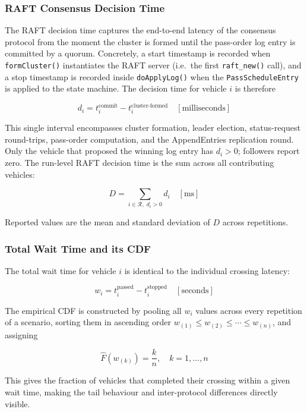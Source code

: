 \documentclass[fleqn,10pt]{olplainarticle}
\begin{document}

\subsubsection{RAFT Consensus Decision Time}

The RAFT decision time captures the end-to-end latency of the consensus protocol
from the moment the cluster is formed until the pass-order log entry is committed
by a quorum. Concretely, a start timestamp is recorded when
\texttt{formCluster()} instantiates the RAFT server (i.e.\ the first
\texttt{raft\_new()} call), and a stop timestamp is recorded inside
\texttt{doApplyLog()} when the \texttt{PassScheduleEntry} is applied to the state
machine. The decision time for vehicle $i$ is therefore

\[
  d_i = t_i^{\mathrm{commit}} - t_i^{\mathrm{cluster\text{-}formed}}
        \quad [\text{milliseconds}]
\]

This single interval encompasses cluster formation, leader election,
status-request round-trips, pass-order computation, and the AppendEntries
replication round. Only the vehicle that proposed the winning log entry has
$d_i > 0$; followers report zero. The run-level RAFT decision time is the sum
across all contributing vehicles:

\[
  D = \sum_{i \in \mathcal{R},\; d_i > 0} d_i \quad [\text{ms}]
\]

Reported values are the mean and standard deviation of $D$ across repetitions.

\subsubsection{Total Wait Time and its CDF}

The total wait time for vehicle $i$ is identical to the individual crossing
latency:

\[
  w_i = t_i^{\mathrm{passed}} - t_i^{\mathrm{stopped}} \quad [\text{seconds}]
\]

The empirical CDF is constructed by pooling all $w_i$ values across every
repetition of a scenario, sorting them in ascending order
$w_{(1)} \le w_{(2)} \le \cdots \le w_{(n)}$, and assigning

\[
  \hat{F}(w_{(k)}) = \frac{k}{n}, \quad k = 1, \ldots, n
\]

This gives the fraction of vehicles that completed their crossing within a given
wait time, making the tail behaviour and inter-protocol differences directly
visible.
\end{document}
